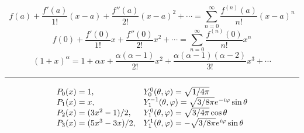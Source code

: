 \documentclass[twocolumn]{article}
\newcommand{\0}{\textcolor{gray}{0}}
\begin{document}
\begin{equation*}
	f(a)+{\frac {f'(a)}{1!}}(x-a)+{\frac {f''(a)}{2!}}(x-a)^{2}+\cdots =\sum _{n=0}^{\infty }{\frac {f^{(n)}(a)}{n!}}(x-a)^{n}
\end{equation*}
\begin{equation*}
	f(0)+{\frac {f'(0)}{1!}}x+{\frac {f''(0)}{2!}}x^{2}+\cdots =\sum _{n=0}^{\infty }{\frac {f^{(n)}(0)}{n!}}x^{n}
\end{equation*}
\begin{equation*}
	(1+x)^{\alpha } = 1+\alpha x+{\frac {\alpha (\alpha -1)}{2!}}x^{2}+{\frac {\alpha (\alpha -1)(\alpha -2)}{3!}}x^{3}+\cdots
\end{equation*}
\hrule\vspace{1mm}
\begin{equation*}
	\begin{matrix}
		P_0(x) = 1,\hfill &				Y_{0}^{0} (\theta,\varphi) = \sqrt{1/4\pi} \hfill\\
		P_1(x) = x,\hfill\ &			Y_{1}^{-1}(\theta,\varphi) = \sqrt{3/8\pi}e^{-i\varphi}\sin\theta\\
		P_2(x) = (3x^2 - 1)/2,\hfill &	Y_{1}^{0} (\theta,\varphi) = \sqrt{3/4\pi}\cos\theta \hfill\\
		P_3(x) = (5x^3 - 3x)/2, &		Y_{1}^{1} (\theta,\varphi) =-\sqrt{3/8\pi}e^{i\varphi}\sin\theta \hfill
	\end{matrix}
\end{equation*}
\end{document}
